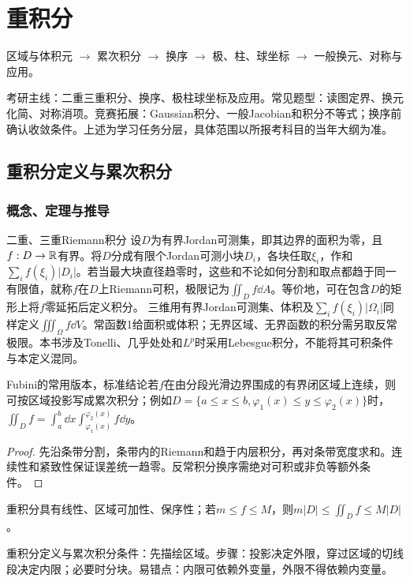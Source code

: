 \chapter{重积分}\label{ch:7}
\begin{tcolorbox}[title=章首知识地图,colframe=Ink]
区域与体积元 $\to$ 累次积分 $\to$ 换序 $\to$ 极、柱、球坐标 $\to$ 一般换元、对称与应用。
\end{tcolorbox}
\begin{examtip}考研主线：二重三重积分、换序、极柱球坐标及应用。常见题型：读图定界、换元化简、对称消项。竞赛拓展：Gaussian积分、一般Jacobian和积分不等式；换序前确认收敛条件。上述为学习任务分层，具体范围以所报考科目的当年大纲为准。\end{examtip}
\section{重积分定义与累次积分}\label{sec:7:1}
\subsection{概念、定理与推导}

\begin{definition}{二重、三重Riemann积分}
设$D$为有界Jordan可测集，即其边界的面积为零，且$f:D\to\mathbb{R}$有界。将$D$分成有限个Jordan可测小块$D_i$，各块任取$\xi_i$，作和$\sum_i f(\xi_i)|D_i|$。若当最大块直径趋零时，这些和不论如何分割和取点都趋于同一有限值，就称$f$在$D$上Riemann可积，极限记为$\iint_Df\dd A$。等价地，可在包含$D$的矩形上将$f$零延拓后定义积分。
三维用有界Jordan可测集、体积及$\sum_i f(\xi_i)|\Omega_i|$同样定义$\iiint_\Omega f\dd V$。常函数1给面积或体积；无界区域、无界函数的积分需另取反常极限。本书涉及Tonelli、几乎处处和$L^p$时采用Lebesgue积分，不能将其可积条件与本定义混同。
\end{definition}
\begin{theorem}{Fubini的常用版本，标准结论}若$f$在由分段光滑边界围成的有界闭区域上连续，则可按区域投影写成累次积分；例如$D=\{a\le x\le b,\varphi_1(x)\le y\le\varphi_2(x)\}$时，$\iint_Df=\int_a^b\dd x\int_{\varphi_1(x)}^{\varphi_2(x)}f\dd y$。\end{theorem}
\begin{proof}先沿条带分割，条带内的Riemann和趋于内层积分，再对条带宽度求和。连续性和紧致性保证误差统一趋零。反常积分换序需绝对可积或非负等额外条件。\end{proof}
重积分具有线性、区域可加性、保序性；若$m\le f\le M$，则$m|D|\le\iint_Df\le M|D|$。

\begin{method}{重积分定义与累次积分}条件：先描绘区域。步骤：投影决定外限，穿过区域的切线段决定内限；必要时分块。易错点：内限可依赖外变量，外限不得依赖内变量。\end{method}
